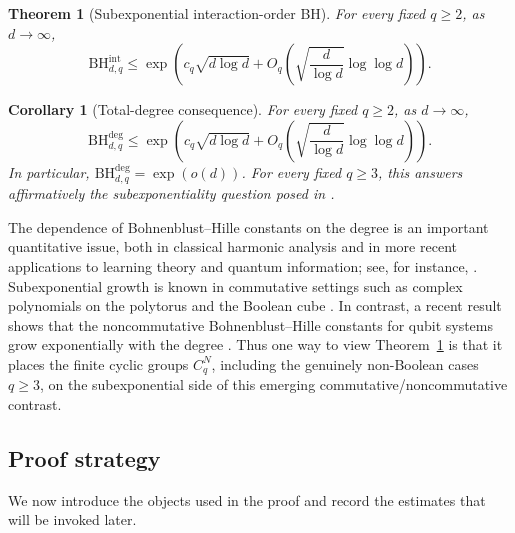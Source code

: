 \documentclass[11pt,a4paper]{article}
\numberwithin{equation}{section}
\theoremstyle{cleanplain}
\newtheorem{maintheorem}{Theorem}
\newtheorem{corollary}[corollary]{Corollary}
\theoremstyle{cleandefinition}
\theoremstyle{cleanremark}
\newcommand{\BHdeg}[2]{\mathrm{BH}^{\mathrm{deg}}_{#1,#2}}
\newcommand{\BHint}[2]{\mathrm{BH}^{\mathrm{int}}_{#1,#2}}
\begin{document}
\begin{maintheorem}[Subexponential interaction-order BH]\label{thm:main}
For every fixed $q\geq2$, as $d\to\infty$,
\begin{equation}\label{eq:main-theorem-intro}
 \BHint{d}{q}\leq
 \exp\left(
 c_q\sqrt{d\log d}
 +O_q\left(\sqrt{\frac d{\log d}}\log\log d\right)
 \right).
\end{equation}
\end{maintheorem}

\begin{corollary}[Total-degree consequence]\label{cor:total-degree}
For every fixed $q\geq2$, as $d\to\infty$,
\begin{equation}\label{eq:total-degree-consequence-intro}
 \BHdeg{d}{q}\leq
 \exp\left(
 c_q\sqrt{d\log d}
 +O_q\left(\sqrt{\frac d{\log d}}\log\log d\right)
 \right).
\end{equation}
In particular, $\BHdeg{d}{q}=\exp(o(d))$.  For every fixed $q\geq3$, this
{\color{black}answers affirmatively the subexponentiality question posed in \cite[Question~2]{BKSVZ}.}
\end{corollary}

{\color{black}
The dependence of Bohnenblust--Hille constants on the degree is an important
quantitative issue, both in classical harmonic analysis and in more recent
applications to learning theory and quantum information; see, for instance,
\cite{DMP,SVZ,SloteDense}.  Subexponential growth is known in commutative
settings such as complex polynomials on the polytorus and the Boolean cube
\cite{BPSS,DMP}.  In contrast, a recent result shows that the noncommutative
Bohnenblust--Hille constants for qubit systems grow exponentially with the
degree \cite{SloteDense}.  Thus one way to view Theorem~\ref{thm:main} is that
it places the finite cyclic groups $C_q^N$, including the genuinely
non-Boolean cases $q\geq3$, on the subexponential side of this emerging
commutative/noncommutative contrast.
}

\subsection*{Proof strategy}

We now introduce the objects used in the proof and record the estimates that
will be invoked later.
\end{document}
